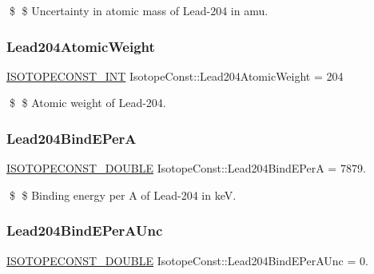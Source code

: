 \$ \$ Uncertainty in atomic mass of Lead-\/204 in amu. \mbox{\label{group___isotope_const-_lead-_pb204_ga5dd4d7df32c0f79e08b9278a889520a3}} 
\subsubsection{\texorpdfstring{Lead204\+Atomic\+Weight}{Lead204AtomicWeight}}
{\footnotesize\ttfamily \mbox{\hyperlink{group___isotope_const-_macros_ga5f18360b3e99483a35c32d789e62621c}{I\+S\+O\+T\+O\+P\+E\+C\+O\+N\+S\+T\+\_\+\+I\+NT}} Isotope\+Const\+::\+Lead204\+Atomic\+Weight = 204}

\$ \$ Atomic weight of Lead-\/204. \mbox{\label{group___isotope_const-_lead-_pb204_ga6def4857d8c265a6833d48bd8fd39fcc}} 
\subsubsection{\texorpdfstring{Lead204\+Bind\+E\+PerA}{Lead204BindEPerA}}
{\footnotesize\ttfamily \mbox{\hyperlink{group___isotope_const-_macros_ga8f45a7272ce02c0b4c65c44636ed719a}{I\+S\+O\+T\+O\+P\+E\+C\+O\+N\+S\+T\+\_\+\+D\+O\+U\+B\+LE}} Isotope\+Const\+::\+Lead204\+Bind\+E\+PerA = 7879.}

\$ \$ Binding energy per A of Lead-\/204 in keV. \mbox{\label{group___isotope_const-_lead-_pb204_ga0e325ef7a67ae3bee6eb321e9320a24a}} 
\subsubsection{\texorpdfstring{Lead204\+Bind\+E\+Per\+A\+Unc}{Lead204BindEPerAUnc}}
{\footnotesize\ttfamily \mbox{\hyperlink{group___isotope_const-_macros_ga8f45a7272ce02c0b4c65c44636ed719a}{I\+S\+O\+T\+O\+P\+E\+C\+O\+N\+S\+T\+\_\+\+D\+O\+U\+B\+LE}} Isotope\+Const\+::\+Lead204\+Bind\+E\+Per\+A\+Unc = 0.}


